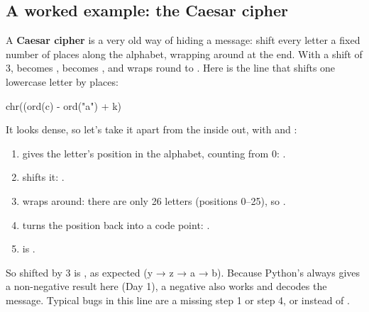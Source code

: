\documentclass[10pt,a4paper]{article}
\begin{document}
\subsection{A worked example: the Caesar cipher}
A \textbf{Caesar cipher} is a very old way of hiding a message: shift every letter a fixed number of places along the alphabet, wrapping around at the end. With a shift of 3,  becomes ,  becomes , and  wraps round to . Here is the line that shifts one lowercase letter  by  places:
\begin{pycode}
chr((ord(c) - ord("a") + k) %
\end{pycode}
It looks dense, so let’s take it apart from the inside out, with  and :
\begin{enumerate}
\item {} gives the letter’s position in the alphabet, counting from 0: .
\item {} shifts it: .
\item {} wraps around: there are only 26 letters (positions 0–25), so .
\item {} turns the position back into a code point: .
\item {} is .
\end{enumerate}
So  shifted by 3 is , as expected (y → z → a → b). Because Python’s \code{\%} always gives a non-negative result here (Day 1), a negative  also works and decodes the message. Typical bugs in this line are a missing step 1 or step 4, or  instead of .
\end{document}
